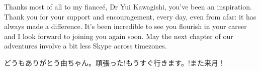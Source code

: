 Thanks most of all to my fiance\'{e}, Dr Yui Kawagishi, you've been an inspiration. Thank you for your support and encouragement, every day, even from afar: it has always made a difference. It’s been incredible to see you flourish in your career and I look forward to joining you again soon. May the next chapter of our adventures involve a bit less Skype across timezones.

\begin{CJK}{UTF8}{goth}どうもありがとう由ちゃん。頑張った!もうすぐ行きます。!また来月！\end{CJK}